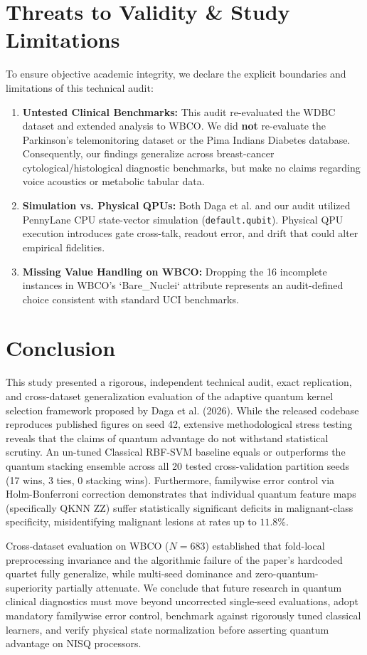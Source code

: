 \documentclass[journal,twocolumn]{IEEEtran}
\begin{document}
\section{Threats to Validity \& Study Limitations}
To ensure objective academic integrity, we declare the explicit boundaries and limitations of this technical audit:
\begin{enumerate}
    \item \textbf{Untested Clinical Benchmarks:} This audit re-evaluated the WDBC dataset and extended analysis to WBCO. We did \textbf{not} re-evaluate the Parkinson's telemonitoring dataset or the Pima Indians Diabetes database. Consequently, our findings generalize across breast-cancer cytological/histological diagnostic benchmarks, but make no claims regarding voice acoustics or metabolic tabular data.
    \item \textbf{Simulation vs. Physical QPUs:} Both Daga et al. and our audit utilized PennyLane CPU state-vector simulation (\texttt{default.qubit}). Physical QPU execution introduces gate cross-talk, readout error, and drift that could alter empirical fidelities.
    \item \textbf{Missing Value Handling on WBCO:} Dropping the 16 incomplete instances in WBCO's `Bare\_Nuclei` attribute represents an audit-defined choice consistent with standard UCI benchmarks.
\end{enumerate}

\section{Conclusion}
This study presented a rigorous, independent technical audit, exact replication, and cross-dataset generalization evaluation of the adaptive quantum kernel selection framework proposed by Daga et al. (2026). While the released codebase reproduces published figures on seed 42, extensive methodological stress testing reveals that the claims of quantum advantage do not withstand statistical scrutiny. An un-tuned Classical RBF-SVM baseline equals or outperforms the quantum stacking ensemble across all 20 tested cross-validation partition seeds (17 wins, 3 ties, 0 stacking wins). Furthermore, familywise error control via Holm-Bonferroni correction demonstrates that individual quantum feature maps (specifically QKNN ZZ) suffer statistically significant deficits in malignant-class specificity, misidentifying malignant lesions at rates up to $11.8\%$.

Cross-dataset evaluation on WBCO ($N=683$) established that fold-local preprocessing invariance and the algorithmic failure of the paper's hardcoded quartet fully generalize, while multi-seed dominance and zero-quantum-superiority partially attenuate. We conclude that future research in quantum clinical diagnostics must move beyond uncorrected single-seed evaluations, adopt mandatory familywise error control, benchmark against rigorously tuned classical learners, and verify physical state normalization before asserting quantum advantage on NISQ processors.
\end{document}
